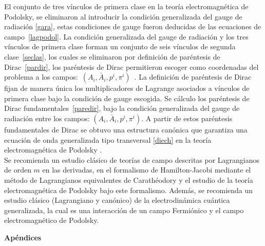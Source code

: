 \documentclass[a4paper,12pt]{article}
\begin{document}
El conjunto de tres vínculos de primera clase en la teoría electromagnética de \mbox{Podolsky,} se eliminaron al introducir la condición generalizada del gauge de radiación \eqref{gara}, estas condiciones de gauge fueron deducidas de las \mbox{ecuaciones} de \mbox{campo \eqref{lagpodol}.} La condición generalizada del gauge de radiación y los tres vínculos de primera clase forman un conjunto de seis vínculos de segunda \mbox{clase \eqref{seclas},} los cuales se eliminaron por definición de paréntesis de \mbox{Dirac \eqref{pardir},} los paréntesis de Dirac \mbox{permitieron} escoger como coordenadas del problema a los \mbox{campos: $(A_i,\bar{A}_i,p^i,\pi^i)$ \cite{podolsky}.} La definición de paréntesis de Dirac fijan de manera única los multiplicadores de Lagrange asociados a vínculos de primera clase bajo la condición de gauge escogida. Se cálculo los paréntesis de Dirac \mbox{fundamentales \eqref{paredir},} bajo la condición generalizada del gauge de radiación entre los campos: $(A_i,\bar{A}_i,p^i,\pi^i)$. A partir de estos paréntesis fundamentales de Dirac se obtuvo una estructura canónica que garantiza una ecuación de onda generalizada tipo transversal \eqref{diech} en la teoría electromagnética de Podolsky  \cite{podolsky}.
\\

Se recomienda un estudio clásico de teorías de campo descritas por Lagrangianos de orden $m$ en las derivadas, en el formalismo de Hamilton-Jacobi mediante el método de Lagrangianos equivalentes de Carathéodory y el estudio de la teoría electromagnética de Podolsky bajo este formalismo. Además, se recomienda un estudio clásico (Lagrangiano y canónico) de la electrodinámica cuántica generalizada, la cual es una interacción de un campo Fermiónico y el campo electromagnético de Podolsky.
\newpage
\appendix
\centerline{\textbf{Apéndices}}
\vspace{0,5cm}
\\
\end{document}
